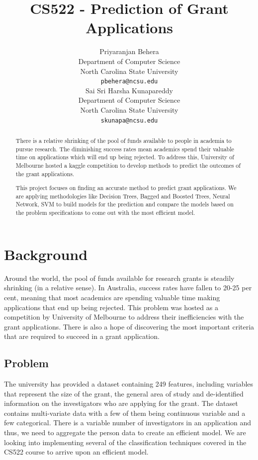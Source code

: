\documentclass{article} %
\title{CS522 - Prediction of Grant Applications}
\author{
Priyaranjan Behera\\
Department of Computer Science\\
North Carolina State University\\
\texttt{pbehera@ncsu.edu} \\
\And
Sai Sri Harsha Kunapareddy\\
Department of Computer Science\\
North Carolina State University\\
\texttt{skunapa@ncsu.edu} \\
}
\begin{document}
\maketitle

\begin{abstract}
There is a relative shrinking of the pool of funds available to people in academia to pursue research. The diminishing success rates mean academics spend their valuable time on applications which will end up being rejected. To address this, University of Melbourne hosted a kaggle competition to develop methods to predict the outcomes of the grant applications. 

This project focuses on finding an accurate method to predict grant applications. We are applying methodologies like Decision Trees, Bagged and Boosted Trees, Neural Network, SVM to build models for the prediction and compare the models based on the problem specifications to come out with the most efficient model. 
\end{abstract}

\section{Background}

Around the world, the pool of funds available for research grants is steadily shrinking (in a relative sense). In Australia, success rates have fallen to 20-25 per cent, meaning that most academics are spending valuable time making applications that end up being rejected. This problem was hosted as a competition by University of Melbourne to address their inefficiencies with the grant applications. There is also a hope of discovering the most important criteria that are required to succeed in a grant application. 

\subsection{Problem}

The university has provided a dataset containing 249 features, including variables that represent the size of the grant, the general area of study and de-identified information on the investigators who are applying for the grant. The dataset contains multi-variate data with a few of them being continuous variable and a few categorical. There is a variable number of investigators in an application and thus, we need to aggregate the person data to create an efficient model. We are looking into implementing several of the classification techniques covered in the CS522 course to arrive upon an efficient model.
\end{document}

